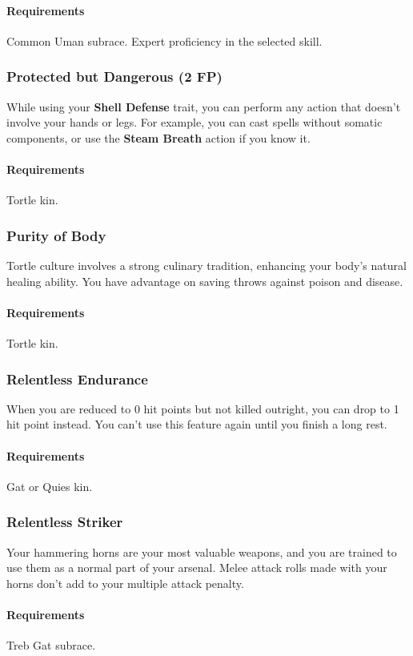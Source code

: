     \paragraph{Requirements} Common Uman subrace. Expert proficiency in the selected skill.
\subsubsection{Protected but Dangerous (2 FP)} \label{feat::protectedbutdangerous}
    While using your \textbf{Shell Defense} trait, you can perform any action that doesn't involve your hands or legs.
    For example, you can cast spells without somatic components, or use the \textbf{Steam Breath} action if you know it.
    \paragraph{Requirements} Tortle kin.
\subsubsection{Purity of Body} \label{feat::purityofbody}
    Tortle culture involves a strong culinary tradition, enhancing your body's natural healing ability.
    You have advantage on saving throws against poison and disease.
    \paragraph{Requirements} Tortle kin.
\subsubsection{Relentless Endurance} \label{feat::relentlessendurance}
    When you are reduced to 0 hit points but not killed outright, you can drop to 1 hit point instead.
    You can't use this feature again until you finish a long rest.
    \paragraph{Requirements} Gat or Quies kin.
\subsubsection{Relentless Striker} \label{feat::relentlessstriker}
    Your hammering horns are your most valuable weapons, and you are trained to use them as a normal part of your arsenal.
    Melee attack rolls made with your horns don't add to your multiple attack penalty.
    \paragraph{Requirements} Treb Gat subrace.

